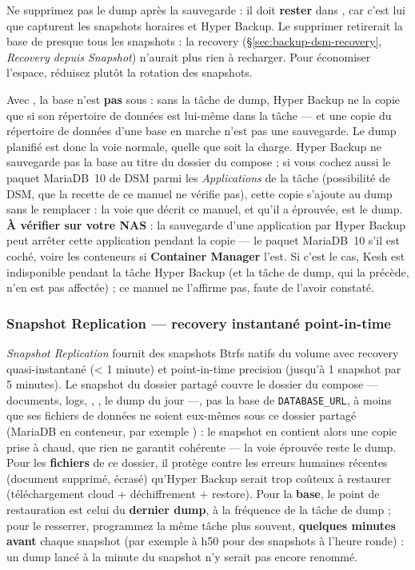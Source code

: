 \documentclass[a4paper,11pt,oneside]{article}
\begin{document}
Ne supprimez pas le dump après la sauvegarde : il doit \textbf{rester} dans , car c'est lui que capturent les snapshots horaires et Hyper Backup. Le supprimer retirerait la base de presque tous les snapshots : la recovery (\S\ref{sec:backup-dsm-recovery}, \emph{Recovery depuis Snapshot}) n'aurait plus rien à recharger. Pour économiser l'espace, réduisez plutôt la rotation des snapshots.

\begin{keshnote}
Avec , la base n'est \textbf{pas} sous  : sans la tâche de dump, Hyper Backup ne la copie que si son répertoire de données est lui-même dans la tâche --- et une copie du répertoire de données d'une base en marche n'est pas une sauvegarde. Le dump planifié est donc la voie normale, quelle que soit la charge. Hyper Backup ne sauvegarde pas la base au titre du dossier du compose ; si vous cochez aussi le paquet MariaDB~10 de DSM parmi les \emph{Applications} de la tâche (possibilité de DSM, que la recette de ce manuel ne vérifie pas), cette copie s'ajoute au dump sans le remplacer : la voie que décrit ce manuel, et qu'il a éprouvée, est le dump. \textbf{À vérifier sur votre NAS} : la sauvegarde d'une application par Hyper Backup peut arrêter cette application pendant la copie --- le paquet MariaDB~10 s'il est coché, voire les conteneurs si \textbf{Container Manager} l'est. Si c'est le cas, Kesh est indisponible pendant la tâche Hyper Backup (et la tâche de dump, qui la précède, n'en est pas affectée) ; ce manuel ne l'affirme pas, faute de l'avoir constaté.
\end{keshnote}

\subsubsection{Snapshot Replication — recovery instantané point-in-time}

\emph{Snapshot Replication} fournit des snapshots Btrfs natifs du volume  avec recovery quasi-instantané (< 1 minute) et point-in-time precision (jusqu'à 1 snapshot par 5 minutes). Le snapshot du dossier partagé  couvre le dossier du compose --- documents, logs, , , le dump du jour ---, pas la base de \texttt{DATABASE\_URL}, à moins que ses fichiers de données ne soient eux-mêmes sous ce dossier partagé (MariaDB en conteneur, par exemple ) : le snapshot en contient alors une copie prise à chaud, que rien ne garantit cohérente --- la voie éprouvée reste le dump. Pour les \textbf{fichiers} de ce dossier, il protège contre les erreurs humaines récentes (document supprimé,  écrasé) qu'Hyper Backup serait trop coûteux à restaurer (téléchargement cloud + déchiffrement + restore). Pour la \textbf{base}, le point de restauration est celui du \textbf{dernier dump}, à la fréquence de la tâche de dump ; pour le resserrer, programmez la même tâche plus souvent, \textbf{quelques minutes avant} chaque snapshot (par exemple à h50 pour des snapshots à l'heure ronde) : un dump lancé à la minute du snapshot n'y serait pas encore renommé.
\end{document}
